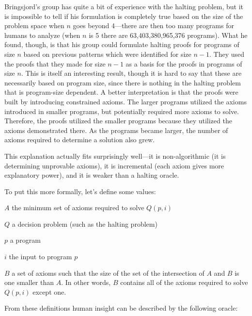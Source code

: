 Bringsjord's group has quite a bit of experience with the halting problem, but it is impossible to tell if his formulation is completely true based on the size of the problem space when $n$ goes beyond 4---there are then too many programs for humans to analyze (when $n$ is 5 there are 63,403,380,965,376 programs).  What he found, though, is that his group could formulate halting proofs for programs of size $n$ based on previous patterns which were identified for size $n - 1$.  They used the proofs that they made for size $n - 1$ as a basis for the proofs in programs of size $n$.  This is itself an interesting result, though it is hard to say that these are necessarily based on program size, since there is nothing in the halting problem that is program-size dependent.  A better interpretation is that the proofs were built by introducing constrained axioms.  The larger programs utilized the axioms introduced in smaller programs, but potentially required more axioms to solve.  Therefore, the proofs utilized the smaller programs because they utilized the axioms demonstrated there.  As the programs became larger, the number of axioms required to determine a solution also grew.

This explanation actually fits surprisingly well---it is non-algorithmic (it is determining unprovable axioms), it is incremental (each axiom gives more explanatory power), and it is weaker than a halting oracle.

To put this more formally, let's define some values: 

\begin{description}
\item{$A$}
the minimum set of axioms required to solve $Q(p, i)$

\item{$Q$}
a decision problem (such as the halting problem)

\item{$p$}
a program

\item{$i$} 
the input to program $p$

\item{$B$}
a set of axioms such that the size of the set of the intersection of $A$ and $B$ is one smaller than $A$.  In other words, $B$ contains all of the axioms required to solve $Q(p, i)$ except one.
\end{description}

From these definitions human insight can be described by the following oracle:


